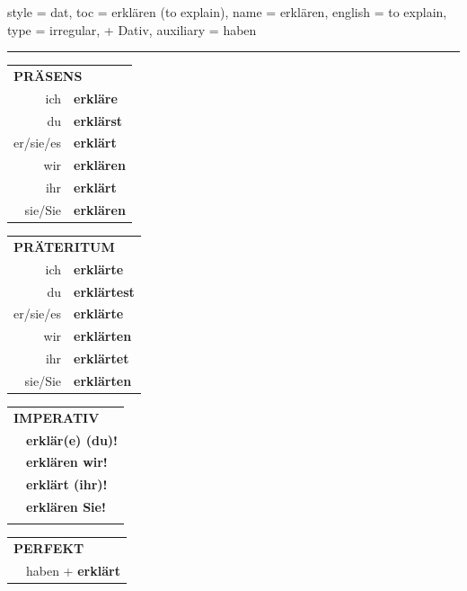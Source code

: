 \begin{verbentry}{
  style = {dat},
  toc = {erklären (to explain)},
  name = {erklären},
  english = {to explain},
  type = {irregular, + Dativ},
  auxiliary = {haben}
}
 
    
     \vspace{5pt}

    \hrule
    
    \vspace{5pt}

  \begin{tabular}{rl}
     \multicolumn{2}{l}{\textbf{PRÄSENS} }\\
    ich & \textbf{erkläre}\\
    du & \textbf{erklärst}\\
    er/sie/es & \textbf{erklärt}\\
    wir & \textbf{erklären}\\
    ihr & \textbf{erklärt}\\
    sie/Sie & \textbf{erklären}\\
  \end{tabular}
  \hfill
     \begin{tabular}{rl}
    \multicolumn{2}{l}{\textbf{PRÄTERITUM} }\\
    ich & \textbf{erklärte}\\
    du & \textbf{erklärtest}\\
    er/sie/es & \textbf{erklärte}\\
    wir & \textbf{erklärten}\\
    ihr & \textbf{erklärtet}\\
    sie/Sie & \textbf{erklärten}\\
  \end{tabular}
  \hfill
  \begin{tabular}{rl}
     \multicolumn{2}{l}{\textbf{IMPERATIV} }\\
   & \textbf{erklär(e) (du)!}\\
   & \textbf{erklären wir!}\\
   & \textbf{erklärt (ihr)!}\\
   & \textbf{erklären Sie!}\\
   & \vspace{10pt}
  \end{tabular}

    \vspace{10pt}

 \begin{tabular}{rl}
     \multicolumn{2}{l}{\textbf{PERFEKT}}\\
  &  haben + \textbf{erklärt}\\
  \end{tabular}
\hfill
   \begin{tabular}{rl}
   

\end{tabular}
\end{verbentry}
